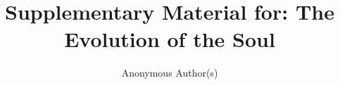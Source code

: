 \documentclass[sigconf,anonymous]{aamas}
\title{Supplementary Material for: The Evolution of the Soul}
\author{Anonymous Author(s)}
\affiliation{\institution{Anonymous Institution}\country{Country}}
\begin{document}
\maketitle

\FloatBarrier


\end{document}
